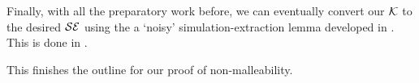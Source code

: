 Finally, with all the preparatory work before, we can eventually convert our $\mathcal{K}$ to the desired $\mathcal{SE}$ using the a `noisy' simulation-extraction lemma developed in . This is done in .

This finishes the outline for our proof of non-malleability.








